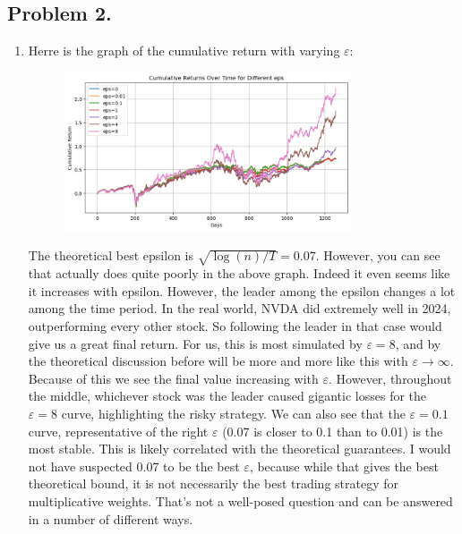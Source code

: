\documentclass[12pt]{article}
\def\ve{\varepsilon}
\begin{document}
    \subsection*{Problem 2.}
    \begin{enumerate}[label=(\alph*)]
        \item Herre is the graph of the cumulative return with varying $\ve$:
        \begin{figure}[H]
            \centering
            \includegraphics[width=0.8\textwidth]{cum_return_diff_eps.png}
        \end{figure}
        The theoretical best epsilon is $\sqrt{\log(n)/T} = 0.07$. However, you can see  that actually does quite poorly in the above graph. Indeed it even seems like it increases with epsilon. However, the leader among the epsilon changes a lot among the time period. In the real world, NVDA did extremely well in 2024, outperforming every other stock. So following the leader in that case would give us a great final return. For us, this is most simulated by $\ve = 8$, and by the theoretical discussion before will be more and more like this with $\ve \to \infty$. Because of this we see the final value increasing with $\ve$. However, throughout the middle, whichever stock was the leader caused gigantic losses for the $\ve = 8$ curve, highlighting the risky strategy. We can also see that the $\ve = 0.1$ curve, representative of the right $\ve$ (0.07 is closer to 0.1 than to 0.01) is the most stable. This is likely correlated with the theoretical guarantees. I would not have suspected 0.07 to be the best $\ve$, because while that gives the best theoretical bound, it is not necessarily the best trading strategy for multiplicative weights. That's not a well-posed question and can be answered in a number of different ways. 


\end{enumerate}
\end{document}
